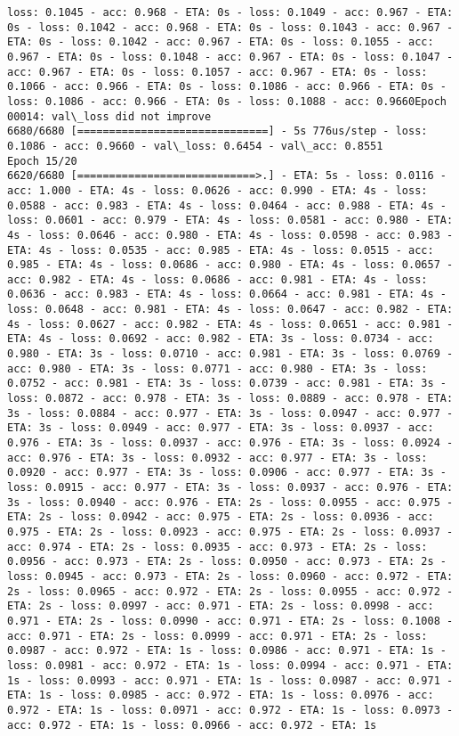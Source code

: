 \documentclass[11pt]{article}
\begin{document}
\begin{Verbatim}[commandchars=\\\{\}]
loss: 0.1045 - acc: 0.968 - ETA: 0s - loss: 0.1049 - acc: 0.967 - ETA: 0s - loss: 0.1042 - acc: 0.968 - ETA: 0s - loss: 0.1043 - acc: 0.967 - ETA: 0s - loss: 0.1042 - acc: 0.967 - ETA: 0s - loss: 0.1055 - acc: 0.967 - ETA: 0s - loss: 0.1048 - acc: 0.967 - ETA: 0s - loss: 0.1047 - acc: 0.967 - ETA: 0s - loss: 0.1057 - acc: 0.967 - ETA: 0s - loss: 0.1066 - acc: 0.966 - ETA: 0s - loss: 0.1086 - acc: 0.966 - ETA: 0s - loss: 0.1086 - acc: 0.966 - ETA: 0s - loss: 0.1088 - acc: 0.9660Epoch 00014: val\_loss did not improve
6680/6680 [==============================] - 5s 776us/step - loss: 0.1086 - acc: 0.9660 - val\_loss: 0.6454 - val\_acc: 0.8551
Epoch 15/20
6620/6680 [============================>.] - ETA: 5s - loss: 0.0116 - acc: 1.000 - ETA: 4s - loss: 0.0626 - acc: 0.990 - ETA: 4s - loss: 0.0588 - acc: 0.983 - ETA: 4s - loss: 0.0464 - acc: 0.988 - ETA: 4s - loss: 0.0601 - acc: 0.979 - ETA: 4s - loss: 0.0581 - acc: 0.980 - ETA: 4s - loss: 0.0646 - acc: 0.980 - ETA: 4s - loss: 0.0598 - acc: 0.983 - ETA: 4s - loss: 0.0535 - acc: 0.985 - ETA: 4s - loss: 0.0515 - acc: 0.985 - ETA: 4s - loss: 0.0686 - acc: 0.980 - ETA: 4s - loss: 0.0657 - acc: 0.982 - ETA: 4s - loss: 0.0686 - acc: 0.981 - ETA: 4s - loss: 0.0636 - acc: 0.983 - ETA: 4s - loss: 0.0664 - acc: 0.981 - ETA: 4s - loss: 0.0648 - acc: 0.981 - ETA: 4s - loss: 0.0647 - acc: 0.982 - ETA: 4s - loss: 0.0627 - acc: 0.982 - ETA: 4s - loss: 0.0651 - acc: 0.981 - ETA: 4s - loss: 0.0692 - acc: 0.982 - ETA: 3s - loss: 0.0734 - acc: 0.980 - ETA: 3s - loss: 0.0710 - acc: 0.981 - ETA: 3s - loss: 0.0769 - acc: 0.980 - ETA: 3s - loss: 0.0771 - acc: 0.980 - ETA: 3s - loss: 0.0752 - acc: 0.981 - ETA: 3s - loss: 0.0739 - acc: 0.981 - ETA: 3s - loss: 0.0872 - acc: 0.978 - ETA: 3s - loss: 0.0889 - acc: 0.978 - ETA: 3s - loss: 0.0884 - acc: 0.977 - ETA: 3s - loss: 0.0947 - acc: 0.977 - ETA: 3s - loss: 0.0949 - acc: 0.977 - ETA: 3s - loss: 0.0937 - acc: 0.976 - ETA: 3s - loss: 0.0937 - acc: 0.976 - ETA: 3s - loss: 0.0924 - acc: 0.976 - ETA: 3s - loss: 0.0932 - acc: 0.977 - ETA: 3s - loss: 0.0920 - acc: 0.977 - ETA: 3s - loss: 0.0906 - acc: 0.977 - ETA: 3s - loss: 0.0915 - acc: 0.977 - ETA: 3s - loss: 0.0937 - acc: 0.976 - ETA: 3s - loss: 0.0940 - acc: 0.976 - ETA: 2s - loss: 0.0955 - acc: 0.975 - ETA: 2s - loss: 0.0942 - acc: 0.975 - ETA: 2s - loss: 0.0936 - acc: 0.975 - ETA: 2s - loss: 0.0923 - acc: 0.975 - ETA: 2s - loss: 0.0937 - acc: 0.974 - ETA: 2s - loss: 0.0935 - acc: 0.973 - ETA: 2s - loss: 0.0956 - acc: 0.973 - ETA: 2s - loss: 0.0950 - acc: 0.973 - ETA: 2s - loss: 0.0945 - acc: 0.973 - ETA: 2s - loss: 0.0960 - acc: 0.972 - ETA: 2s - loss: 0.0965 - acc: 0.972 - ETA: 2s - loss: 0.0955 - acc: 0.972 - ETA: 2s - loss: 0.0997 - acc: 0.971 - ETA: 2s - loss: 0.0998 - acc: 0.971 - ETA: 2s - loss: 0.0990 - acc: 0.971 - ETA: 2s - loss: 0.1008 - acc: 0.971 - ETA: 2s - loss: 0.0999 - acc: 0.971 - ETA: 2s - loss: 0.0987 - acc: 0.972 - ETA: 1s - loss: 0.0986 - acc: 0.971 - ETA: 1s - loss: 0.0981 - acc: 0.972 - ETA: 1s - loss: 0.0994 - acc: 0.971 - ETA: 1s - loss: 0.0993 - acc: 0.971 - ETA: 1s - loss: 0.0987 - acc: 0.971 - ETA: 1s - loss: 0.0985 - acc: 0.972 - ETA: 1s - loss: 0.0976 - acc: 0.972 - ETA: 1s - loss: 0.0971 - acc: 0.972 - ETA: 1s - loss: 0.0973 - acc: 0.972 - ETA: 1s - loss: 0.0966 - acc: 0.972 - ETA: 1s 
\end{Verbatim}
\end{document}
